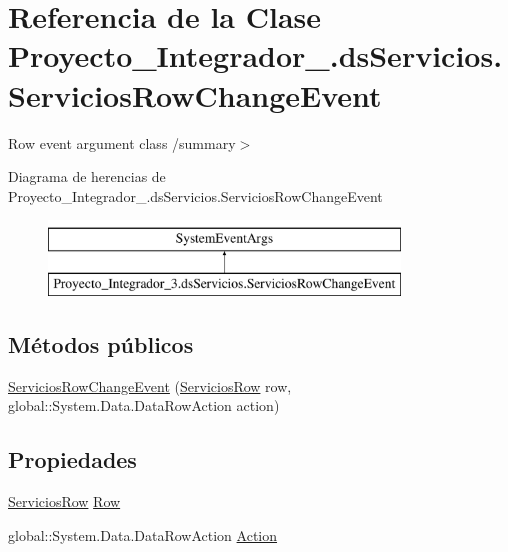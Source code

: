 \hypertarget{class_proyecto___integrador__3_1_1ds_servicios_1_1_servicios_row_change_event}{\section{Referencia de la Clase Proyecto\-\_\-\-Integrador\-\_.\-ds\-Servicios.\-Servicios\-Row\-Change\-Event}
\label{class_proyecto___integrador__3_1_1ds_servicios_1_1_servicios_row_change_event}
}


Row event argument class /summary$>$  


Diagrama de herencias de Proyecto\-\_\-\-Integrador\-\_.\-ds\-Servicios.\-Servicios\-Row\-Change\-Event\begin{figure}[H]
\begin{center}
\leavevmode
\includegraphics[height=2.000000cm]{df/d11/class_proyecto___integrador__3_1_1ds_servicios_1_1_servicios_row_change_event}
\end{center}
\end{figure}
\subsection*{Métodos públicos}
\begin{DoxyCompactItemize}
\item 
\hyperlink{class_proyecto___integrador__3_1_1ds_servicios_1_1_servicios_row_change_event_ab03013b6ec28ef9ffccceafe1ac6478f}{Servicios\-Row\-Change\-Event} (\hyperlink{class_proyecto___integrador__3_1_1ds_servicios_1_1_servicios_row}{Servicios\-Row} row, global\-::\-System.\-Data.\-Data\-Row\-Action action)
\end{DoxyCompactItemize}
\subsection*{Propiedades}
\begin{DoxyCompactItemize}
\item 
\hyperlink{class_proyecto___integrador__3_1_1ds_servicios_1_1_servicios_row}{Servicios\-Row} \hyperlink{class_proyecto___integrador__3_1_1ds_servicios_1_1_servicios_row_change_event_a512b019ea6afe14ff0fab96bdae1b003}{Row}
\item 
global\-::\-System.\-Data.\-Data\-Row\-Action \hyperlink{class_proyecto___integrador__3_1_1ds_servicios_1_1_servicios_row_change_event_aec3aca217f6b4c8f2a4e3f6d15d875cc}{Action}
\end{DoxyCompactItemize}
